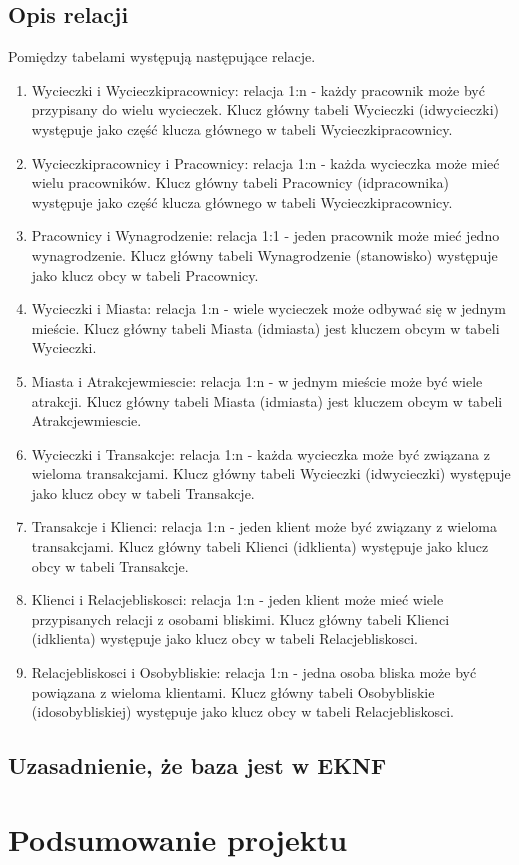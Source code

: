 \documentclass{article}
\begin{document}
	\subsection{Opis relacji}
	
	Pomiędzy tabelami występują następujące relacje.
	
	\begin{enumerate}
		\item Wycieczki i Wycieczki\textunderscore pracownicy: relacja 1:n - każdy pracownik może być przypisany do wielu wycieczek. Klucz główny tabeli Wycieczki (id\textunderscore wycieczki) występuje jako część klucza głównego w tabeli Wycieczki\textunderscore pracownicy. 
		\item Wycieczki\textunderscore pracownicy i Pracownicy: relacja 1:n - każda wycieczka może mieć wielu pracowników. Klucz główny tabeli Pracownicy (id\textunderscore pracownika) występuje jako część klucza głównego w tabeli Wycieczki\textunderscore pracownicy.
		\item Pracownicy i Wynagrodzenie: relacja 1:1 - jeden pracownik może mieć jedno wynagrodzenie. Klucz główny tabeli Wynagrodzenie (stanowisko) występuje jako klucz obcy w tabeli Pracownicy.
		\item Wycieczki i Miasta: relacja 1:n - wiele wycieczek może odbywać się w jednym mieście. Klucz główny tabeli Miasta (id\textunderscore miasta) jest kluczem obcym w tabeli Wycieczki.
		\item Miasta i Atrakcje\textunderscore w\textunderscore miescie: relacja 1:n - w jednym mieście może być wiele atrakcji. Klucz główny tabeli Miasta (id\textunderscore miasta) jest kluczem obcym w tabeli Atrakcje\textunderscore w\textunderscore miescie.
		\item Wycieczki i Transakcje: relacja 1:n - każda wycieczka może być związana z wieloma transakcjami. Klucz główny tabeli Wycieczki (id\textunderscore wycieczki) występuje jako klucz obcy w tabeli Transakcje.
		\item Transakcje i Klienci: relacja 1:n - jeden klient może być związany z wieloma transakcjami. Klucz główny tabeli Klienci (id\textunderscore klienta) występuje jako klucz obcy w tabeli Transakcje.
		\item Klienci i Relacje\textunderscore bliskosci: relacja 1:n - jeden klient może mieć wiele przypisanych relacji z osobami bliskimi. Klucz główny tabeli Klienci (id\textunderscore klienta) występuje jako klucz obcy w tabeli Relacje\textunderscore bliskosci.
		\item Relacje\textunderscore bliskosci i Osoby\textunderscore bliskie: relacja 1:n - jedna osoba bliska może być powiązana z wieloma klientami. Klucz główny tabeli Osoby\textunderscore bliskie (id\textunderscore osoby\textunderscore bliskiej) występuje jako klucz obcy w tabeli Relacje\textunderscore bliskosci.
	\end{enumerate}
	
	\subsection{Uzasadnienie, że baza jest w EKNF}
	
	
	
	
	\section{Podsumowanie projektu}
	
\end{document}
